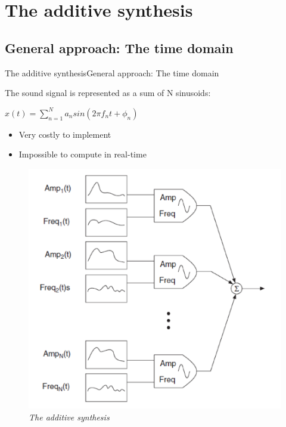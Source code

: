 \documentclass[10pt]{beamer}
\begin{document}
\section{The additive synthesis}
\subsection{General approach: The time domain}
\begin{frame}{The additive synthesis}{General approach: The time domain}
\begin{block}{}
The sound signal is represented as a sum of N sinusoids: \\
\centerline{
$ x(t) = \sum\limits_{n=1}^N a_{n} sin(2 \pi f_{n} t + \phi_{n})$}
\begin{itemize}
\item Very costly to implement
\item Impossible to compute in real-time
\end{itemize}
\end{block}
\begin{figure}
	\centerline
	{\includegraphics[scale=0.25]{additif.png}}
	\caption{\it The additive synthesis}
\end{figure}
\end{frame}
\end{document}
